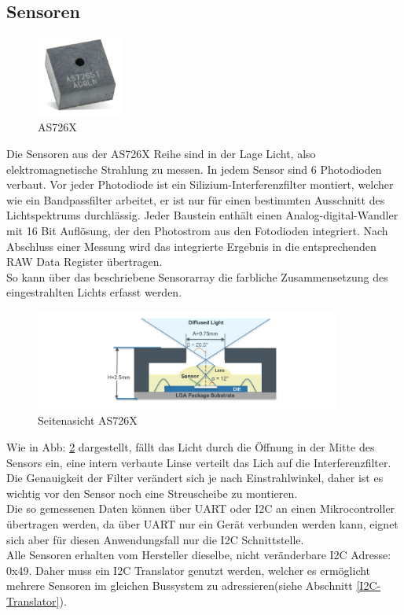 \newpage
\subsection{Sensoren}\label{Sensoren}

\begin{figure}
\centering
\includegraphics[width=0.25\textwidth]{img/as726X.png}
 \caption{AS726X \cite{Datenblatt_AS7265X}}
\label{fig:AS726X}
\end{figure}

Die Sensoren aus der AS726X Reihe sind in der Lage Licht, also elektromagnetische Strahlung zu messen. 
In jedem Sensor sind 6 Photodioden verbaut. 
Vor jeder Photodiode ist ein Silizium-Interferenzfilter montiert, welcher wie ein Bandpassfilter arbeitet, er ist nur für einen bestimmten Ausschnitt des Lichtspektrums durchlässig.
Jeder Baustein enthält einen Analog-digital-Wandler mit 16 Bit Auflösung, der den Photostrom aus den Fotodioden integriert. Nach Abschluss einer Messung wird das integrierte Ergebnis in die entsprechenden RAW Data Register übertragen.\\
So kann über das beschriebene Sensorarray die farbliche Zusammensetzung des eingestrahlten Lichts erfasst werden.

\begin{figure}[H]
\centering
\includegraphics[width=0.9\textwidth]{img/AS726X-seitenansicht.png}
\caption{Seitenasicht AS726X\cite{Datenblatt_AS7265X}}
\label{fig:Seitenasicht-AS726X}
\end{figure}

\noindent Wie in Abb: \ref{fig:Seitenasicht-AS726X} dargestellt, fällt das Licht durch die Öffnung in der Mitte des Sensors ein, eine intern verbaute Linse verteilt das Lich auf die Interferenzfilter. Die Genauigkeit der Filter verändert sich je nach Einstrahlwinkel, daher ist es wichtig vor den Sensor noch eine Streuscheibe zu montieren.\\
Die so gemessenen Daten können über UART oder I2C an einen Mikrocontroller übertragen werden, da über UART nur ein Gerät verbunden werden kann, eignet sich aber für diesen Anwendungsfall nur die I2C Schnittstelle.\\
Alle Sensoren erhalten vom Hersteller dieselbe, nicht veränderbare I2C Adresse: 0x49. Daher muss ein I2C Translator genutzt werden, welcher es ermöglicht mehrere Sensoren im gleichen Bussystem zu adressieren(siehe Abschnitt \ref{I2C-Translator}).\\


